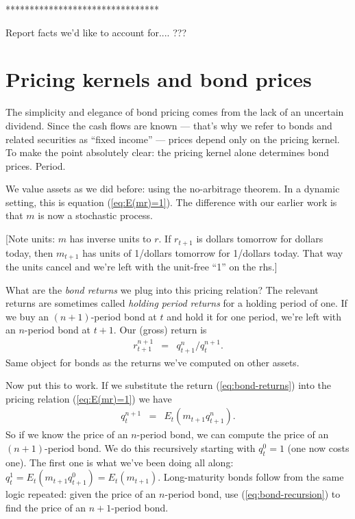 \documentclass[11pt]{article}
\begin{document}
********************************

Report facts we'd like to account for....  ???


\section{Pricing kernels and bond prices}

The simplicity and elegance of bond pricing comes
from the lack of an uncertain dividend.
Since the cash flows are known ---
that's why we refer to bonds and related securities as ``fixed income'' ---
prices depend only on the pricing kernel.
To make the point absolutely clear:  the pricing kernel alone determines
bond prices.  Period.


We value assets as we did before:  using the no-arbitrage theorem.
In a dynamic setting, this is equation (\ref{eq:E(mr)=1}).
The difference with our earlier work is that $m$ is now a stochastic process.

[Note units:  $m$ has inverse units to $r$.
If $r_{t+1}$ is dollars tomorrow for dollars today,
then $m_{t+1}$ has units of 1/dollars tomorrow
for 1/dollars today.
That way the units cancel and we're left with the unit-free ``1'' on the rhs.]

What are the {\it bond returns\/} we plug into this pricing relation?
The relevant returns are sometimes called {\it holding period returns\/}
for a holding period of one.
If we buy an $(n+1)$-period bond at $t$ and hold it for one period,
we're left with an $n$-period bond at $t+1$.
Our (gross) return is
\begin{eqnarray}
        r^{n+1}_{t+1} &=&  q^n_{t+1}/q^{n+1}_t .
        \label{eq:bond-returns}
\end{eqnarray}
Same object for bonds as the returns we've computed on
other assets.


Now put this to work.  If we substitute the return (\ref{eq:bond-returns})
into the pricing relation (\ref{eq:E(mr)=1}) we have
\begin{eqnarray}
    q^{n+1}_t &=& E_t \left( m_{t+1} q^n_{t+1} \right) .
    \label{eq:bond-recursion}
\end{eqnarray}
So if we know the price of an $n$-period bond,
we can compute the price of an $(n+1)$-period bond.
We do this recursively starting with $q^0_t = 1$ (one now costs one).
The first one is what we've been doing all along:
$ q^1_t = E_t (m_{t+1} q^0_{t+1}) = E_t (m_{t+1})$.
Long-maturity bonds follow from the same logic repeated:
given the price of an $n$-period bond,
use (\ref{eq:bond-recursion}) to find the price of an $n+1$-period bond.
\end{document}
